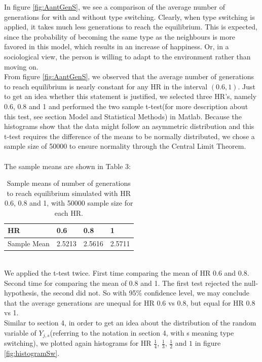 In figure \ref{fig:AantGenS}, we see a comparison of the average number of generations for with and without type switching. 
Clearly, when type switching is applied, it takes much less generations to reach the equilibrium. 
This is expected, since the probability of becoming the same type as the neighbours is more favored in this model, which results in an increase of happiness. 
Or, in a sociological view, the person is willing to adapt to the environment rather than moving on.\\

From figure \ref{fig:AantGenS}, we observed that the average number of generations to reach equilibrium is nearly constant for any HR in the interval \((0.6,1)\). 
Just to get an idea whether this statement is justified, we selected three HR's, namely 0.6, 0.8 and 1 and performed the two sample t-test(for more description about this test, see section Model and Statistical Methods) in Matlab. Because the histograms show that the data might follow an asymmetric distribution and this t-test requires the difference of the means to be normally distributed, we chose a sample size of 50000 to ensure normality through the Central Limit Theorem.\\
\\
The sample means are shown in Table 3:
\begin{table}[htp]
\centering
\caption{Sample means of number of generations to reach equilibrium simulated with HR 0.6, 0.8 and 1, with 50000 sample size for each HR.}
\begin{tabular}{|l|l|l|l|}
\hline
 HR&0.6&0.8&1 \\ \hline
 Sample Mean&2.5213&2.5616&2.5711  \\ \hline 
\end{tabular}
\end{table}
\\
We applied the t-test twice. First time comparing the mean of HR 0.6 and 0.8. Second time for comparing the mean of 0.8 and 1. The first test rejected the null-hypothesis, the second did not. So with 95\% confidence level, we may conclude that the average generations are unequal for HR 0.6 vs 0.8, but equal for HR 0.8 vs 1.\\
\newpage
Similar to section 4, in order to get an idea about the distribution of the random variable of $Y_{j,s}$(referring to the notation in section 4, with s meaning type switching), we plotted again histograms for HR $\frac{1}{4}$, $\frac{1}{3}$, $\frac{1}{2}$ and $1$ in figure \ref{fig:histogramSw}.

